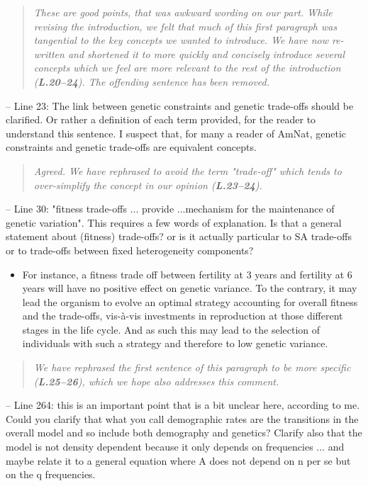 \documentclass[11pt]{article}
\begin{document}
\begin{quote}
	{\itshape These are good points, that was awkward wording on our part. While revising the introduction, we felt that much of this first paragraph was tangential to the key concepts we wanted to introduce. We have now re-written and shortened it to more quickly and concisely introduce several concepts which we feel are more relevant to the rest of the introduction ({\bf L.20--24}). The offending sentence has been removed.}
\end{quote}


\noindent -- Line 23: The link between genetic constraints and genetic trade-offs should be clarified. Or rather a definition of each term provided, for the reader to understand this sentence. I suspect that, for many a reader of AmNat, genetic constraints and genetic trade-offs are equivalent concepts.

\begin{quote}
	{\itshape Agreed. We have rephrased to avoid the term "trade-off" which tends to over-simplify the concept in our opinion ({\bf L.23--24}).}
\end{quote}

\noindent -- Line 30: "fitness trade-offs ... provide ...mechanism for the maintenance of genetic variation". This requires a few words of explanation. Is that a general statement about (fitness) trade-offs? or is it actually particular to SA trade-offs or to trade-offs between fixed heterogeneity components?
\begin{itemize}
	\item For instance, a fitness trade off between fertility at 3 years and fertility at 6 years will have no positive effect on genetic variance. To the contrary, it may lead the organism to evolve an optimal strategy accounting for overall fitness and the trade-offs, vis-à-vis investments in reproduction at those different stages in the life cycle. And as such this may lead to the selection of individuals with such a strategy and therefore to low genetic variance.
\end{itemize}

\begin{quote}
	{\itshape We have rephrased the first sentence of this paragraph to be more specific ({\bf L.25--26}), which we hope also addresses this comment.}
\end{quote}


\noindent -- Line 264: this is an important point that is a bit unclear here, according to me. Could you clarify that what you call demographic rates are the transitions in the overall model and so include both demography and genetics? Clarify also that the model is not density dependent because it only depends on frequencies ... and maybe relate it to a general equation where A does not depend on n per se but on the q frequencies.
\end{document}
